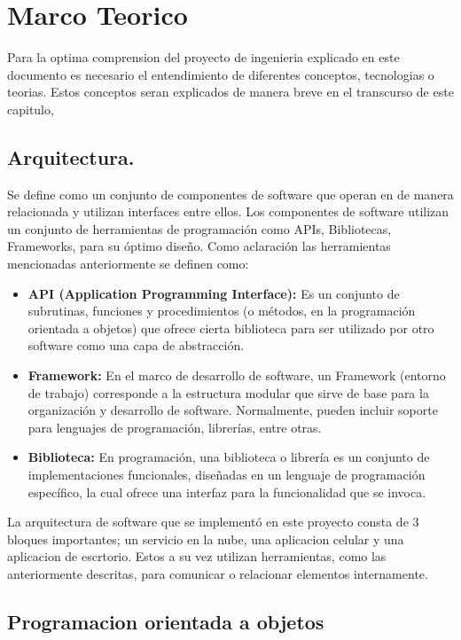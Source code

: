 \section{Marco Teorico}

Para la optima comprension del proyecto de ingenieria explicado en este documento es necesario el entendimiento de diferentes conceptos, tecnologias o teorias. Estos conceptos seran explicados de manera breve en el transcurso de este capitulo, 

\subsection{Arquitectura.}
Se define como un conjunto de componentes de software que operan en de manera relacionada y utilizan interfaces entre ellos. Los componentes de software utilizan un conjunto de herramientas de programación como APIs, Bibliotecas, Frameworks, para su óptimo diseño. Como aclaración las herramientas mencionadas anteriormente se definen como:

\begin{itemize}
	\item \textbf{API (Application Programming Interface):} Es un conjunto de subrutinas, funciones y procedimientos (o métodos, en la programación orientada a objetos) que ofrece cierta biblioteca para ser utilizado por otro software como una capa de abstracción.
    
	\item \textbf{Framework:} En el marco de desarrollo de software, un Framework (entorno de trabajo) corresponde a la estructura  modular que sirve de base para la organización y desarrollo de software. Normalmente, pueden incluir soporte para lenguajes de programación, librerías, entre otras. 
	\item \textbf{Biblioteca:} En programación, una biblioteca o librería es un conjunto de implementaciones funcionales, diseñadas en un lenguaje de programación específico, la cual ofrece una interfaz para la funcionalidad que se invoca.
\end{itemize}

La arquitectura de software que se implementó en este proyecto consta de 3 bloques importantes; un servicio en la nube, una aplicacion celular y una aplicacion de escrtorio. Estos a su vez utilizan herramientas, como las anteriormente descritas, para comunicar o relacionar elementos internamente.


\subsection{Programacion orientada a objetos}


